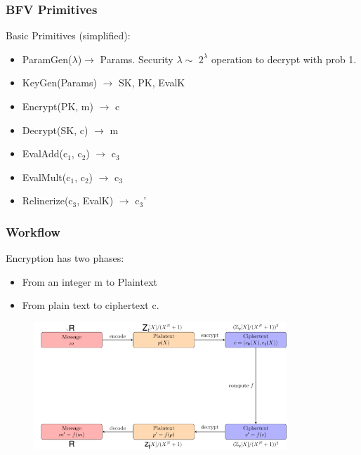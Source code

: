 \documentclass[10pt,handout]{beamer}
\begin{document}


\begin{frame}
\frametitle{BFV Primitives}

    Basic Primitives (simplified):
\begin{itemize}
    \item ParamGen($\lambda$)$\rightarrow$ Params. Security $\lambda \sim$ $2^\lambda$ operation to decrypt with prob 1.
    \item KeyGen(Params) $\rightarrow$ SK, PK, EvalK
    \item Encrypt(PK, m) $\rightarrow$ c
    \item Decrypt(SK, c) $\rightarrow$ m
    \item EvalAdd(c$_1$, c$_2$) $\rightarrow$ c$_3$
    \item EvalMult(c$_1$, c$_2$) $\rightarrow$ c$_3$
    \item Relinerize(c$_3$, EvalK) $\rightarrow$ c$_3$'
\end{itemize}

\end{frame}



\begin{frame}
\frametitle{Workflow}

    Encryption has two phases:
\begin{itemize}
    \item From an integer m to Plaintext
    \item From plain text to ciphertext c.
\end{itemize}


\begin{figure}
    \includegraphics[width=0.85\textwidth]{bfv-diagram.png}
\end{figure}


\end{frame}
\end{document}
